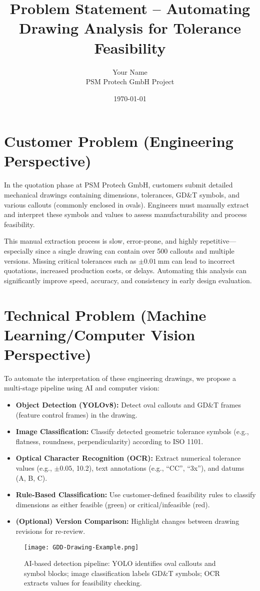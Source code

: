 \documentclass[a4paper,12pt]{article}
\title{\textbf{Problem Statement -- Automating Drawing Analysis for Tolerance Feasibility}}
\author{Your Name \\ PSM Protech GmbH Project}
\date{\today}
\begin{document}
\maketitle

\section*{Customer Problem (Engineering Perspective)}

In the quotation phase at PSM Protech GmbH, customers submit detailed mechanical drawings containing dimensions, tolerances, GD\&T symbols, and various callouts (commonly enclosed in ovals). Engineers must manually extract and interpret these symbols and values to assess manufacturability and process feasibility.

This manual extraction process is slow, error-prone, and highly repetitive---especially since a single drawing can contain over 500 callouts and multiple versions. Missing critical tolerances such as $\pm 0.01~\text{mm}$ can lead to incorrect quotations, increased production costs, or delays. Automating this analysis can significantly improve speed, accuracy, and consistency in early design evaluation.

\section*{Technical Problem (Machine Learning/Computer Vision Perspective)}

To automate the interpretation of these engineering drawings, we propose a multi-stage pipeline using AI and computer vision:

\begin{itemize}
  \item \textbf{Object Detection (YOLOv8):} Detect oval callouts and GD\&T frames (feature control frames) in the drawing.
  \item \textbf{Image Classification:} Classify detected geometric tolerance symbols (e.g., flatness, roundness, perpendicularity) according to ISO 1101.
  \item \textbf{Optical Character Recognition (OCR):} Extract numerical tolerance values (e.g., $\pm 0.05$, 10.2), text annotations (e.g., ``CC'', ``3x''), and datums (A, B, C).
  \item \textbf{Rule-Based Classification:} Use customer-defined feasibility rules to classify dimensions as either feasible (green) or critical/infeasible (red).
  \item \textbf{(Optional) Version Comparison:} Highlight changes between drawing revisions for re-review.
\end{itemize}

\begin{figure}[h!]
  \centering
  \texttt{[image: GDD-Drawing-Example.png]}
  \caption{AI-based detection pipeline: YOLO identifies oval callouts and symbol blocks; image classification labels GD\&T symbols; OCR extracts values for feasibility checking.}
  \label{fig:pipeline_example}
\end{figure}
\end{document}
